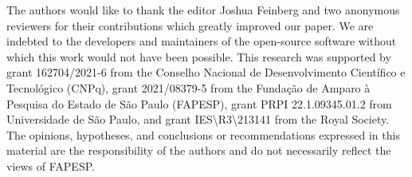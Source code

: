 The authors would like to thank the editor Joshua Feinberg and two anonymous reviewers for their contributions which greatly improved our paper. We are indebted to the developers and maintainers of the open-source software
without which this work would not have been possible.
This research was supported by
grant 162704/2021-6 from the Conselho Nacional de Desenvolvimento Científico e Tecnológico (CNPq),
grant 2021/08379-5 from the Fundação de Amparo à Pesquisa do Estado de São Paulo (FAPESP),
grant PRPI 22.1.09345.01.2 from Universidade de São Paulo,
and grant IES\textbackslash{}R3\textbackslash{}213141 from the Royal Society.
The opinions, hypotheses, and conclusions or recommendations expressed in this
material are the responsibility of the authors and do not necessarily reflect
the views of FAPESP.

